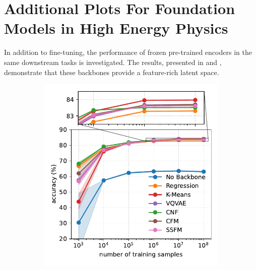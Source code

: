 \chapter{Additional Plots For Foundation Models in High Energy Physics}
\label{app:foundation_models}

In addition to fine-tuning, the performance of frozen pre-trained encoders in the same downstream tasks is investigated.
The results, presented in  and , demonstrate that these backbones provide a feature-rich latent space.

\begin{figure}[h!]
    \centering
    \begin{subfigure}{0.32\linewidth}
        \centering
        \includegraphics[width=\linewidth]{Figures/foundation_models/mpm2/final/jetclass_frozen.pdf}
        \caption{}
        \label{fig:jetclass_fixed}
    \end{subfigure}
    \begin{subfigure}[b]{0.32\textwidth}
        \centering

\end{subfigure}
\end{figure}
